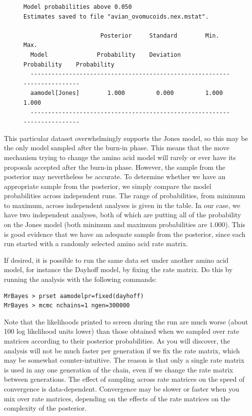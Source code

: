 \documentclass[12pt]{book}
\begin{document}
\begin{figure}[h]\singlespacing\footnotesize
\begin{verbatim}
Model probabilities above 0.050
Estimates saved to file "avian_ovomucoids.nex.mstat".

                      Posterior     Standard        Min.           Max.   
  Model              Probability    Deviation    Probability    Probability
  -------------------------------------------------------------------------
  aamodel[Jones]        1.000         0.000         1.000          1.000
  -------------------------------------------------------------------------
\end{verbatim}\end{figure}

This particular dataset overwhelmingly supports the Jones model, so this may be the only model
sampled after the burn-in phase. This means that the move mechanism trying to change the amino acid
model will rarely or ever have its proposals accepted after the burn-in phase. However, the sample
from the posterior may nevertheless be accurate. To determine whether we have an appropriate sample
from the posterior, we simply compare the model probabilities across independent runs. The range of
probabilities, from minimum to maximum, across independent analyses is given in the table. In our
case, we have two independent analyses, both of which are putting all of the probability on the
Jones model (both minimum and maximum probabilities are $1.000$). This is good evidence that we
have an adequate sample from the posterior, since each run started with a randomly selected amino
acid rate matrix.

If desired, it is possible to run the same data set under another amino acid model, for instance
the Dayhoff model, by fixing the rate matrix. Do this by running the analysis with the following
commands:

\begin{singlespacing}\small
\begin{verbatim}
MrBayes > prset aamodelpr=fixed(dayhoff)
MrBayes > mcmc nchains=1 ngen=300000
\end{verbatim}
\normalsize
\end{singlespacing}

Note that the likelihoods printed to screen during the run are much worse (about 100 log likelihood
units lower) than those obtained when we sampled over rate matrices according to their posterior
probabilities. As you will discover, the analysis will not be much faster per generation if we fix
the rate matrix, which may be somewhat counter-intuitive. The reason is that only a single rate
matrix is used in any one generation of the chain, even if we change the rate matrix between
generations. The effect of sampling across rate matrices on the speed of convergence is
data-dependent. Convergence may be slower or faster when you mix over rate matrices, depending on
the effects of the rate matrices on the complexity of the posterior.
\end{document}
